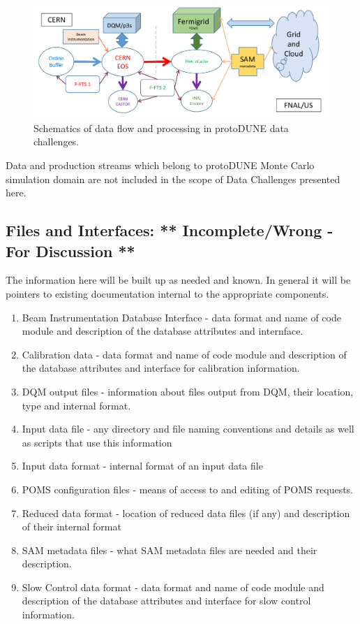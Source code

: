 \documentclass[pdftex,12pt,letter]{article}
\newcommand{\pd}{protoDUNE\xspace}
\begin{document}
\begin{figure}[tbh]
  \centering
  \includegraphics[width=1.0\textwidth]{../figures/data_challenge_1.pdf}
  \caption{Schematics of data flow and  processing in \pd data challenges.}
  \label{fig:dc1}
\end{figure}
\noindent Data and production streams which belong to \pd Monte Carlo simulation domain are not included in the
scope of Data Challenges presented here.



\subsection{Files and Interfaces: ** Incomplete/Wrong  - For Discussion **}


The information here will be built up as needed and known. In general it will be pointers to existing documentation  internal to the appropriate components. 
\renewcommand{\theenumi}{\alph{enumi}}
\begin{enumerate}
\item Beam Instrumentation Database Interface - data format and name of code module and description of the database attributes and internface.
\item Calibration data  -  data format and name of code module and description of the database attributes and interface for calibration information.
\item DQM output files - information about files output from DQM, their location, type and internal format.
\item Input data file - any directory and file naming conventions and details as well as scripts that use this information
\item Input data format - internal format of an input data file
\item POMS configuration files - means of access to and editing of POMS requests.
\item Reduced data format - location of reduced data files (if any) and description of their internal format
\item SAM metadata files  - what SAM metadata files are needed and their description.
\item Slow Control data format - data format and name of code module and description of the database attributes and interface for slow control information.
\end{enumerate}
\renewcommand{\theenumi}{\alph{arabic}}
\end{document}
